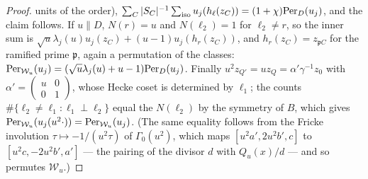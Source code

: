 \documentclass[11pt,a4paper]{article}
\theoremstyle{remark}\newtheorem{remark}[theorem]{Remark}
\begin{document}
\begin{proof}
units of the order), $\sum_C|S_C|^{-1}\sum_{\text{iso}}u_j(h_\ell(z_C))=(1+\chi)\mathrm{Per}_D(u_j)$, and the claim follows.
If $u\parallel D$, $N(r)=u$ and $N(\ell_2)=1$ for $\ell_2\ne r$, so the inner sum is
$\sqrt u\lambda_j(u)u_j(z_C)+(u-1)u_j(h_r(z_C))$, and $h_r(z_C)=z_{\mathfrak pC}$ for the ramified prime $\mathfrak p$, again a
permutation of the classes: $\mathrm{Per}_{\mathcal W_u}(u_j)=(\sqrt u\lambda_j(u)+u-1)\mathrm{Per}_D(u_j)$. Finally
$u^2z_{Q'}=u z_Q=\alpha'\gamma^{-1}z_0$ with $\alpha'=\left(\begin{smallmatrix}u&0\\0&1\end{smallmatrix}\right)$, whose Hecke coset is
determined by $\ell_1$; the counts $\#\{\ell_2\ne\ell_1:\ell_1\perp\ell_2\}$ equal the $N(\ell_2)$ by the symmetry of $B$, which gives
$\mathrm{Per}_{\mathcal W_u}(u_j(u^2\cdot))=\mathrm{Per}_{\mathcal W_u}(u_j)$. (The same equality follows from the Fricke involution $\tau\mapsto-1/(u^2\tau)$
of $\Gamma_0(u^2)$, which maps $[u^2a',2u^2b',c]$ to $[u^2c,-2u^2b',a']$ --- the pairing of the divisor $d$ with $Q_u(x)/d$ --- and
so permutes $\mathcal W_u$.)
\end{proof}
\end{document}
